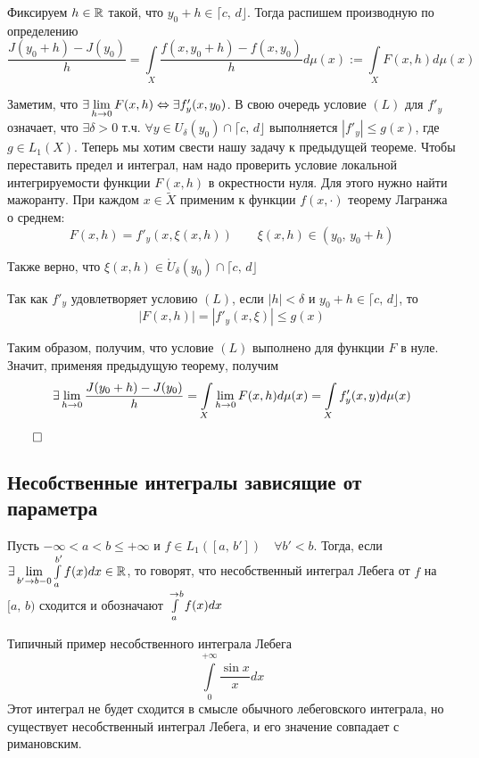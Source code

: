 \proof Фиксируем $h \in \mathbb{R}$ такой, что $y_0 + h \in \lceil c, \, d \rfloor$. Тогда распишем производную по определению
$$\frac{J(y_0 + h) - J(y_0)}{h} = \int\limits_X \frac{f(x, y_0 + h) - f(x, y_0)}{h} d \mu(x) := \int\limits_X F(x, h) d \mu(x)$$

Заметим, что $\exists \lim\limits_{h \rightarrow 0} F(x, h) \Leftrightarrow \exists f'_y(x, y_0)$. В свою очередь условие $(L)$ для $f'_y$ означает, что $\exists \delta > 0$ т.ч. $\forall y \in U_\delta(y_0) \cap \lceil c, \, d \rfloor$ выполняется $\left| f'_y \right| \leq g(x)$, где $g \in L_1(X)$. Теперь мы хотим свести нашу задачу к предыдущей теореме. Чтобы переставить предел и интеграл, нам надо проверить условие локальной интегрируемости функции $F(x, h)$ в окрестности нуля. Для этого нужно найти мажоранту. При каждом $x \in \widetilde{X}$ применим к функции $f(x, \cdot)$ теорему Лагранжа о среднем:
$$F(x, h) = f'_y(x, \xi(x, h)) \qquad \xi(x, h) \in (y_0, \, y_0 + h)$$

Также верно, что $\xi(x, h) \in \mathring{U}_\delta(y_0) \cap \lceil c, \, d \rfloor$

Так как $f'_y$ удовлетворяет условию $(L)$, если $|h| < \delta$ и $y_0 + h \in \lceil c, \, d \rfloor$, то
$$\left| F(x, h)\right| = |f'_y(x, \xi)| \leq g(x)$$

Таким образом, получим, что условие $(L)$ выполнено для функции $F$ в нуле. Значит, применяя предыдущую теорему, получим
$$\exists \lim\limits_{h \rightarrow 0} \frac{J(y_0 + h) - J(y_0)}{h} = \int\limits_X \lim\limits_{h \rightarrow 0} F(x, h) d \mu (x) = \int\limits_X f'_y(x, y) d \mu(x)$$

$\qed$

\subsection{Несобственные интегралы зависящие от параметра}

 Пусть $- \infty < a < b \leq + \infty$ и $f \in L_1([a, \, b']) \quad \forall b' < b$. Тогда, если $\exists \lim \limits_{b' \rightarrow b - 0} \int\limits^{b'}_a f(x) dx \in \mathbb{R}$, то говорят, что несобственный интеграл Лебега от $f$ на $[a, \, b)$ сходится и обозначают $\int\limits^{\rightarrow b}_a f(x)dx$

\remark Типичный пример несобственного интеграла Лебега
$$\int\limits^{+\infty}_0 \frac{\sin x}{x} d x$$
Этот интеграл не будет сходится в смысле обычного лебеговского интеграла, но существует несобственный интеграл Лебега, и его значение совпадает с римановским.

